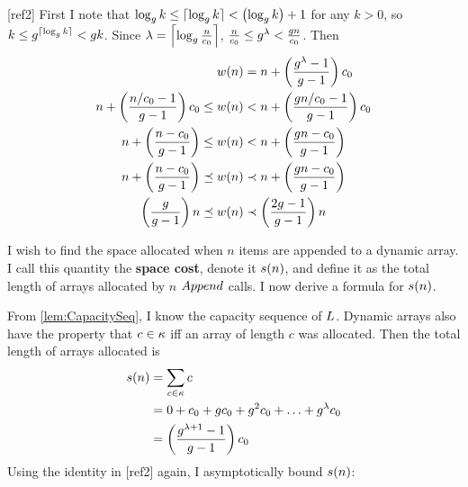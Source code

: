 [ref2]
First I note that $\log_{g} k \leq \lceil \log_{g} k \rceil < \left( \log_{g} k \right) + 1$ for any $k > 0$, so $k \leq g^{\lceil \log_{g} k \rceil} < g{k}$. Since $\lambda = \left\lceil \log_{g} \frac{n}{c_0} \right\rceil$, $\frac n {c_0} \leq g^\lambda < \frac {g{n}} {c_0}$. Then
\begin{align*}
w(n) &= n + \left( \frac{g^\lambda - 1}{g - 1} \right) c_0\\
n + \left( \frac{n / c_0 - 1}{g - 1} \right) c_0 \leq w(n) &< n + \left( \frac{g{n} / c_0 - 1}{g - 1} \right) c_0\\
n + \left( \frac{n - c_0}{g - 1} \right) \leq w(n) &< n + \left( \frac{g{n} - c_0}{g - 1} \right)\\
n + \left( \frac{n - c_0}{g - 1} \right) \preceq w(n) &\prec n + \left( \frac{g{n} - c_0}{g - 1} \right)\\
\left( \frac{g}{g - 1} \right) n \preceq w(n) &\prec \left( \frac{2g - 1}{g - 1} \right) n
\end{align*}
\HdrSpaceComplex

I wish to find the space allocated when $n$ items are appended to a dynamic array. I call this quantity the \textbf{space cost}, denote it $s(n)$, and define it as the total length of arrays allocated by $n$ $Append$ calls. I now derive a formula for $s(n)$.

From \ref{lem:CapacitySeq}, I know the capacity sequence of $L$. Dynamic arrays also have the property that $c \in \kappa$ iff an array of length $c$ was allocated. Then the total length of arrays allocated is
\begin{align*}
s(n) &= \sum_{c \in \kappa} c\\
&= 0 + c_0 + gc_0 + g^2c_0 + \ldots + g^\lambda c_0\\
&= \left( \frac{g^{\lambda + 1} - 1}{g - 1} \right) c_0
\end{align*}
Using the identity in [ref2] again, I asymptotically bound $s(n)$:

